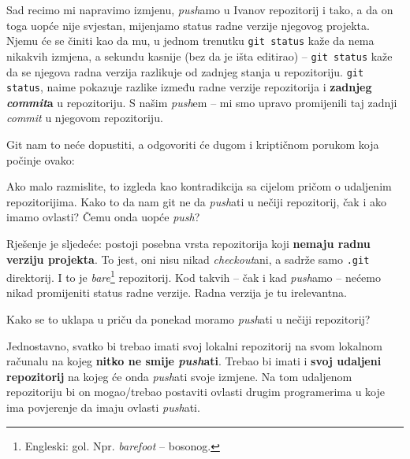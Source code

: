 Sad recimo mi napravimo izmjenu, \emph{push}amo u Ivanov repozitorij i tako, a da on toga uopće nije svjestan, mijenjamo status radne verzije njegovog projekta.
Njemu će se činiti kao da mu, u jednom trenutku \verb+git status+ kaže da nema nikakvih izmjena, a sekundu kasnije (bez da je išta editirao) -- \verb+git status+ kaže da se njegova radna verzija razlikuje od zadnjeg stanja u repozitoriju.
\verb+git status+, naime pokazuje razlike između radne verzije repozitorija i \textbf{zadnjeg \emph{commit}a} u repozitoriju.
S našim \emph{push}em -- mi smo upravo promijenili taj zadnji \emph{commit} u njegovom repozitoriju.

Git nam to neće dopustiti, a odgovoriti će dugom i kriptičnom porukom koja počinje ovako:


Ako malo razmislite, to izgleda kao kontradikcija sa cijelom pričom o udaljenim repozitorijima.
Kako to da nam git ne da \emph{push}ati u nečiji repozitorij, čak i ako imamo ovlasti?
Čemu onda uopće \emph{push}?

Rješenje je sljedeće: postoji posebna vrsta repozitorija koji \textbf{nemaju radnu verziju projekta}.
To jest, oni nisu nikad \emph{checkout}ani, a sadrže samo \verb+.git+ direktorij.
I to je \emph{bare}\footnote{Engleski: gol. Npr. \emph{barefoot} -- bosonog.} repozitorij.
Kod takvih -- čak i kad \emph{push}amo -- nećemo nikad promijeniti status radne verzije.
Radna verzija je tu irelevantna.

Kako se to uklapa u priču da ponekad moramo \emph{push}ati u nečiji repozitorij?

Jednostavno, svatko bi trebao imati svoj lokalni repozitorij na svom lokalnom računalu na kojeg \textbf{nitko ne smije \emph{push}ati}.
Trebao bi imati i \textbf{svoj udaljeni repozitorij} na kojeg će onda \emph{push}ati svoje izmjene.
Na tom udaljenom repozitoriju bi on mogao/trebao postaviti ovlasti drugim programerima u koje ima povjerenje da imaju ovlasti \emph{push}ati.

